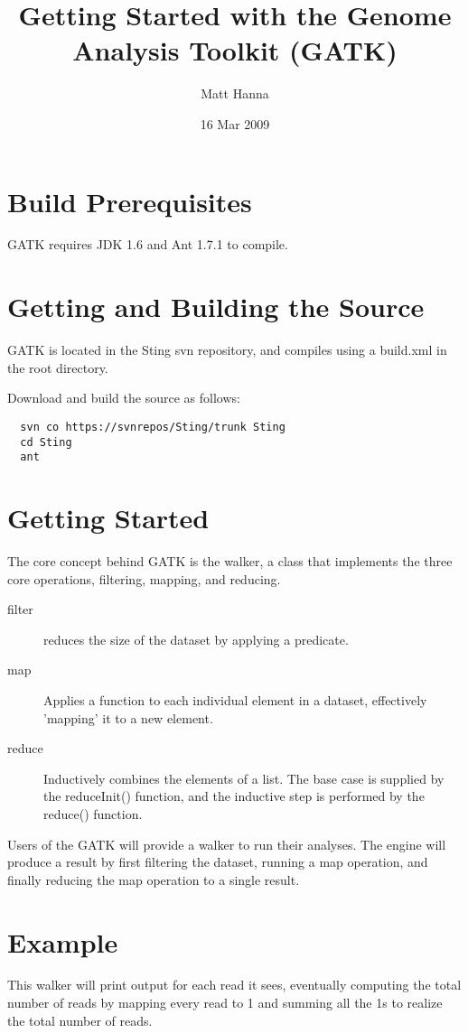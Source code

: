\documentclass[11pt,fullpage]{article}
\begin{document}
\title{Getting Started with the Genome Analysis Toolkit (GATK)}
\author{Matt Hanna}
\date{16 Mar 2009}
\maketitle

\section{Build Prerequisites}
GATK requires JDK 1.6 and Ant 1.7.1 to compile.

\section{Getting and Building the Source}
GATK is located in the Sting svn repository, and
compiles using a build.xml in the root directory.

Download and build the source as follows:
\begin{verbatim}
  svn co https://svnrepos/Sting/trunk Sting
  cd Sting
  ant
\end{verbatim}

\section{Getting Started}
The core concept behind GATK is the walker, a class that implements the 
three core operations, filtering, mapping, and reducing.

\begin{description}
  \item [filter] reduces the size of the dataset by applying a predicate.  
  \item [map] Applies a function to each individual element in a dataset, 
    effectively 'mapping' it to a new element.
  \item [reduce] Inductively combines the elements of a list.  The base
    case is supplied by the reduceInit() function, and the inductive step
    is performed by the reduce() function.
\end{description}
Users of the GATK will provide a walker to run their analyses.  The engine
will produce a result by first filtering the dataset, running a map operation,
and finally reducing the map operation to a single result.  

\section{Example}
This walker will print output for each read it sees, eventually computing the
total number of reads by mapping every read to 1 and summing all the 1s to
realize the total number of reads.
\end{document}
